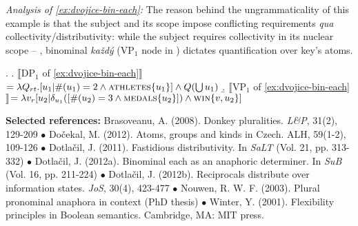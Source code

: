 \documentclass[12pt, a4paper]{scrartcl}
\newcommand{\lb}{\llbracket}
\newcommand{\rb}{\rrbracket}
\newcommand{\sx}[1]{$\lb${#1}$\rb$}
\begin{document}
 
 
 \textit{Analysis of \ref{ex:dvojice-bin-each}:} The reason behind the ungrammaticality of this example is that the subject and its scope impose conflicting requirements \textit{qua} collectivity/distributivity: while the subject requires collectivity in its nuclear scope -- \Next[a], binominal \textit{každý} (VP$_1$ node in \Next[b]) dictates quantification over key's atoms.\vspace{-4pt}










\ex. \a. \sx{DP$_1$ of \ref{ex:dvojice-bin-each}}$=\lambda Q_{rt}.[u_1| \#(u_1)=2 \wedge \textsc{athletes}\{u_1\}] \wedge Q(\bigcup u_1)$
\b. \sx{VP$_1$ of \ref{ex:dvojice-bin-each}}$=\lambda v_r[u_2 | \delta_{u_1}([\#(u_2)=3 \wedge \textsc{medals}\{u_2\}]) \wedge \textsc{win}\{v,u_2\}]$


\vspace{-3pt}



\scriptsize
\noindent\textbf{Selected references:} Brasoveanu, A. (2008). Donkey pluralities. \textit{L\&P}, 31(2), 129-209 $\bullet$ Dočekal, M. (2012). Atoms, groups and kinds in Czech. ALH, 59(1-2), 109-126 $\bullet$ Dotlačil, J. (2011). Fastidious distributivity. In \textit{SaLT} (Vol. 21, pp. 313-332) $\bullet$ Dotlačil, J. (2012a). Binominal each as an anaphoric determiner. In \textit{SuB} (Vol. 16, pp. 211-224) $\bullet$ Dotlačil, J. (2012b). Reciprocals distribute over information states. \textit{JoS}, 30(4), 423-477 $\bullet$ Nouwen, R. W. F. (2003). Plural pronominal anaphora in context (PhD thesis) $\bullet$ Winter, Y. (2001). Flexibility principles in Boolean semantics. Cambridge, MA: MIT press.


\end{document}
